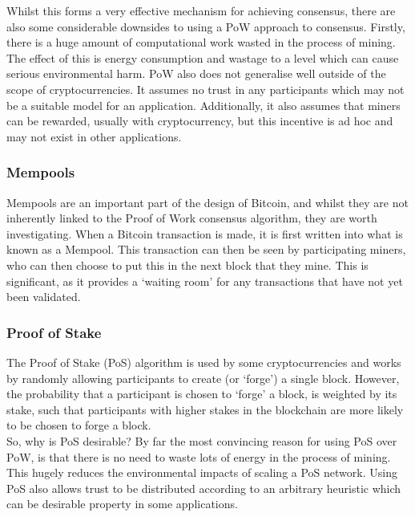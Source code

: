 \documentclass[12pt,a4paper,twoside,openright]{report}
\begin{document}
			Whilst this forms a very effective mechanism for achieving consensus, there are also some considerable downsides to using a PoW approach to consensus. 
			Firstly, there is a huge amount of computational work wasted in the process of mining. 
			The effect of this is energy consumption \cite{BitcoinEnergy} and wastage to a level which can cause serious environmental harm.
			PoW also does not generalise well outside of the scope of cryptocurrencies.
			It assumes no trust in any participants which may not be a suitable model for an application. 
			Additionally, it also assumes that miners can be rewarded, usually with cryptocurrency, but this incentive is ad hoc and may not exist in other applications.
			
			\subsubsection*{Mempools}
			Mempools are an important part of the design of Bitcoin, and whilst they are not inherently linked to the Proof of Work consensus algorithm, they are worth investigating. 
			When a Bitcoin transaction is made, it is first written into what is known as a Mempool. 
			This transaction can then be seen by participating miners, who can then choose to put this in the next block that they mine. 
			This is significant, as it provides a `waiting room' for any transactions that have not yet been validated.  

			\subsubsection*{Proof of Stake}
			The Proof of Stake (PoS) algorithm is used by some cryptocurrencies and works by randomly allowing participants to create (or `forge') a single block.
			However, the probability that a participant is chosen to `forge' a block, is weighted by its stake, such that participants with higher stakes in the blockchain are more likely to be chosen to forge a block.\\

			So, why is PoS desirable? 
			By far the most convincing reason for using PoS over PoW, is that there is no need to waste lots of energy in the process of mining. 
			This hugely reduces the environmental impacts of scaling a PoS network.
			Using PoS also allows trust to be distributed according to an arbitrary heuristic which can be desirable property in some applications.\\
\end{document}
